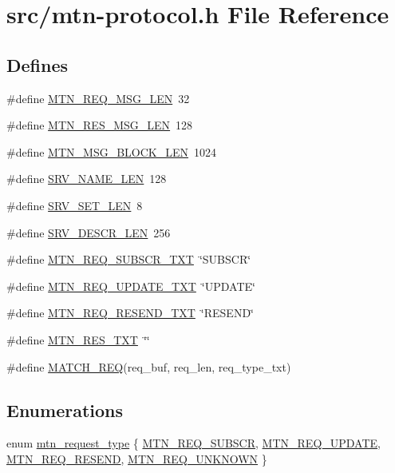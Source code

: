 \hypertarget{mtn-protocol_8h}{
\section{src/mtn-\/protocol.h File Reference}
\label{mtn-protocol_8h}
}
\subsection*{Defines}
\begin{DoxyCompactItemize}
\item 
\#define \hyperlink{mtn-protocol_8h_a53c3fd64ca318700a014307282a75427}{MTN\_\-REQ\_\-MSG\_\-LEN}~32
\item 
\#define \hyperlink{mtn-protocol_8h_a7fb87448607e65238cf0581c5eac7131}{MTN\_\-RES\_\-MSG\_\-LEN}~128
\item 
\#define \hyperlink{mtn-protocol_8h_a961ce2f3830c4d719a85504965d2b898}{MTN\_\-MSG\_\-BLOCK\_\-LEN}~1024
\item 
\#define \hyperlink{mtn-protocol_8h_aacfb594515b533dee748cd6bf3f8d461}{SRV\_\-NAME\_\-LEN}~128
\item 
\#define \hyperlink{mtn-protocol_8h_ad4068c695fe365b4818d7d3998fc2720}{SRV\_\-SET\_\-LEN}~8
\item 
\#define \hyperlink{mtn-protocol_8h_a383295deb5005dfbd7eee3108638474f}{SRV\_\-DESCR\_\-LEN}~256
\item 
\#define \hyperlink{mtn-protocol_8h_a80e112818318cea58e0724380104ae43}{MTN\_\-REQ\_\-SUBSCR\_\-TXT}~\char`\"{}SUBSCR\char`\"{}
\item 
\#define \hyperlink{mtn-protocol_8h_af89799e6a27d6b795bceaa5725f3ced4}{MTN\_\-REQ\_\-UPDATE\_\-TXT}~\char`\"{}UPDATE\char`\"{}
\item 
\#define \hyperlink{mtn-protocol_8h_aaf4374213d7cfb5e00418861325e67e8}{MTN\_\-REQ\_\-RESEND\_\-TXT}~\char`\"{}RESEND\char`\"{}
\item 
\#define \hyperlink{mtn-protocol_8h_aa10ec7921d29bd9fca25c36d6e8956b6}{MTN\_\-RES\_\-TXT}~\char`\"{}\char`\"{}
\item 
\#define \hyperlink{mtn-protocol_8h_ae3bdd167e68bb5c95cc9eaf92cc4a4b5}{MATCH\_\-REQ}(req\_\-buf, req\_\-len, req\_\-type\_\-txt)
\end{DoxyCompactItemize}
\subsection*{Enumerations}
\begin{DoxyCompactItemize}
\item 
enum \hyperlink{mtn-protocol_8h_a0428ffebf6e72018c51d0aaad6ad0c34}{mtn\_\-request\_\-type} \{ \hyperlink{mtn-protocol_8h_a0428ffebf6e72018c51d0aaad6ad0c34afa5f9c3fbf0152a2ea598133d55d822e}{MTN\_\-REQ\_\-SUBSCR}, 
\hyperlink{mtn-protocol_8h_a0428ffebf6e72018c51d0aaad6ad0c34a046270a59edc0b95af1984699f03ed76}{MTN\_\-REQ\_\-UPDATE}, 
\hyperlink{mtn-protocol_8h_a0428ffebf6e72018c51d0aaad6ad0c34a94231d0c62a0c0f2912c4fbb8e4e0a86}{MTN\_\-REQ\_\-RESEND}, 
\hyperlink{mtn-protocol_8h_a0428ffebf6e72018c51d0aaad6ad0c34a1593554b7168500f819f2876ae17149d}{MTN\_\-REQ\_\-UNKNOWN}
 \}
\end{DoxyCompactItemize}


